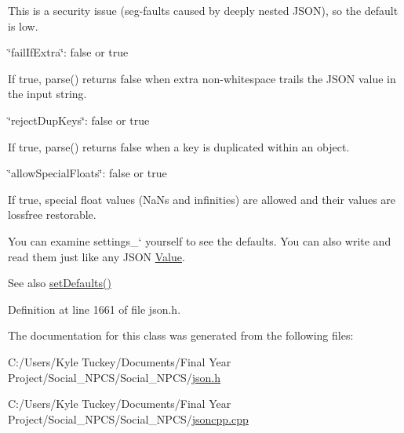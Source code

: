 \begin{DoxyItemize}
\begin{DoxyItemize}
\item This is a security issue (seg-\/faults caused by deeply nested J\+S\+ON), so the default is low.
\end{DoxyItemize}
\item {\ttfamily \char`\"{}fail\+If\+Extra\char`\"{}\+: false or true}
\begin{DoxyItemize}
\item If true, {\ttfamily parse()} returns false when extra non-\/whitespace trails the J\+S\+ON value in the input string.
\end{DoxyItemize}
\item {\ttfamily \char`\"{}reject\+Dup\+Keys\char`\"{}\+: false or true}
\begin{DoxyItemize}
\item If true, {\ttfamily parse()} returns false when a key is duplicated within an object.
\end{DoxyItemize}
\item {\ttfamily \char`\"{}allow\+Special\+Floats\char`\"{}\+: false or true}
\begin{DoxyItemize}
\item If true, special float values (Na\+Ns and infinities) are allowed and their values are lossfree restorable.
\end{DoxyItemize}
\end{DoxyItemize}

You can examine \textquotesingle{}settings\+\_\+` yourself to see the defaults. You can also write and read them just like any J\+S\+ON \hyperlink{class_json_1_1_value}{Value}. \begin{DoxySeeAlso}{See also}
\hyperlink{class_json_1_1_char_reader_builder_a03ff031e06aabff989ab4addc87294ab}{set\+Defaults()} 
\end{DoxySeeAlso}


Definition at line 1661 of file json.\+h.



The documentation for this class was generated from the following files\+:\begin{DoxyCompactItemize}
\item 
C\+:/\+Users/\+Kyle Tuckey/\+Documents/\+Final Year Project/\+Social\+\_\+\+N\+P\+C\+S/\+Social\+\_\+\+N\+P\+C\+S/\hyperlink{json_8h}{json.\+h}\item 
C\+:/\+Users/\+Kyle Tuckey/\+Documents/\+Final Year Project/\+Social\+\_\+\+N\+P\+C\+S/\+Social\+\_\+\+N\+P\+C\+S/\hyperlink{jsoncpp_8cpp}{jsoncpp.\+cpp}\end{DoxyCompactItemize}
